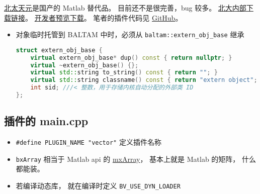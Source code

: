 
\begin{issues}
\issueDraft
\end{issues}

\href{https://www.baltamatica.com/product/NCS.html}{北太天元}是国产的 Matlab 替代品。 目前还不是很完善，bug 较多。 \href{https://disk.pku.edu.cn/#/link/0EE816030B2E1A296FB029890388CD02?gns=41CD4566C310478980471F9C52E8C51B\%252F5B93BC04B04148DAA3CA90083970528B\%252FE869B8A40C754CE4B4033134D7DE6E22}{北大内部下载链接}。 \href{https://www.baltamatica.com/community/sposts/detail/21af2f4f-9e66-5f90-453f-b3cf26ab3833.html}{开发者预览下载}。 笔者的插件代码见 \href{https://github.com/MacroUniverse/baltam-plugin-arb}{GitHub}。

\begin{itemize}
\item 对象临时托管到 BALTAM 中时，必须从 \verb|baltam::extern_obj_base| 继承
\begin{lstlisting}[language=cpp, caption=extern\_obj.h节选]
struct extern_obj_base {
    virtual extern_obj_base* dup() const { return nullptr; }
    virtual ~extern_obj_base() {};
    virtual std::string to_string() const { return ""; }
    virtual std::string classname() const { return "extern object"; };
    int sid; ///< 整数，用于存储内核自动分配的外部类 ID
};
\end{lstlisting}
\end{itemize}

\subsection{插件的 main.cpp}
\begin{itemize}
\item \verb|#define PLUGIN_NAME "vector"| 定义插件名称
\item \verb|bxArray| 相当于 Matlab api 的 \href{https://www.mathworks.com/help/matlab/apiref/mxarray.html}{mxArray}， 基本上就是 Matlab 的矩阵， 什么都能装。
\item 若编译动态库， 就在编译时定义 \verb|BV_USE_DYN_LOADER|
\end{itemize}

